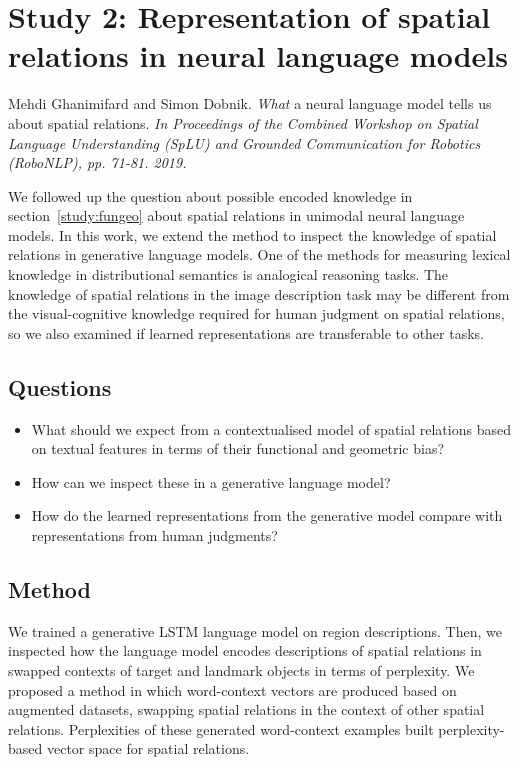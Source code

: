 \section{Study 2: Representation of spatial relations in neural language models}
\label{study:what}
Mehdi Ghanimifard and Simon Dobnik. 
\emph{What} a neural language model tells us about spatial relations.
\textit{In Proceedings of the Combined Workshop on Spatial Language Understanding (SpLU) and Grounded Communication for Robotics (RoboNLP), pp. 71-81. 2019.}

We followed up the question about possible encoded knowledge in section~\ref{study:fungeo} about spatial relations in unimodal neural language models.
In this work, we extend the method to inspect the knowledge of spatial relations in generative language models. 
One of the methods for measuring lexical knowledge in distributional semantics is analogical reasoning tasks. 
The knowledge of spatial relations in the image description task may be different from the visual-cognitive knowledge required for human judgment on spatial relations, so we also examined if learned representations are transferable to other tasks.


\subsection{Questions}
\begin{itemize}
	\item What should we expect from a contextualised model of spatial relations based on textual features in terms of their functional and geometric bias?
	\item How can we inspect these in a generative language model? 
	\item How do the learned representations from the generative model compare with representations from human judgments?
\end{itemize}

\subsection{Method}

We trained a generative LSTM language model on region descriptions. 
Then, we inspected %
how the language model encodes descriptions of spatial relations in swapped contexts of target and landmark objects in terms of perplexity.
We proposed a method in which word-context vectors are produced based on augmented datasets, swapping spatial relations in the context of other spatial relations. Perplexities of these generated word-context examples built perplexity-based vector space for spatial relations. 

